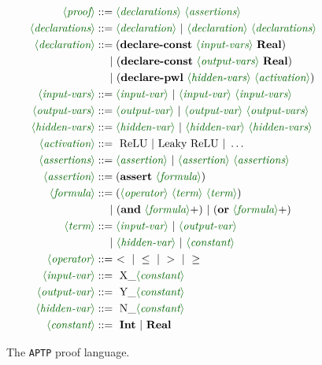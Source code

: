 \documentclass[oneside,11pt,dvipsnames]{book}
\newcommand{\nnproofformat}{\texttt{APTP}}
\begin{document}
\begin{figure}
{\small
\begin{align*}
    \lra{proof}         &::= \lra{declarations} \ \lra{assertions} \\
    \lra{declarations}  &::= \lra{declaration} \ | \ \lra{declaration} \ \lra{declarations} \\
    \lra{declaration}   &::= (\textbf{declare-const} \ \lra{input-vars} \ \textbf{Real}) \\
                        & \quad ~| \ (\textbf{declare-const} \ \lra{output-vars} \ \textbf{Real}) \\
                        & \quad ~| \ (\textbf{declare-pwl} \ \lra{hidden-vars} \ \lra{activation}) \\
    \lra{input-vars}    &::= \lra{input-var} \ | \ \lra{input-var} \ \lra{input-vars} \\
    \lra{output-vars}    &::= \lra{output-var} \ | \ \lra{output-var} \ \lra{output-vars} \\
    \lra{hidden-vars}    &::= \lra{hidden-var} \ | \ \lra{hidden-var} \ \lra{hidden-vars} \\
    \lra{activation}    &::= ~\text{ReLU} \ | \ \text{Leaky ReLU} \ | \ \ldots \\
    \lra{assertions}    &::= \lra{assertion} \ | \ \lra{assertion} \ \lra{assertions} \\
    \lra{assertion}     &::= (\textbf{assert} \ \lra{formula}) \\
    \lra{formula}       &::= (\lra{operator} \ \lra{term} \ \lra{term}) \\
                        & \quad ~| \ (\textbf{and} \ \lra{formula}+) \ | \ (\textbf{or} \ \lra{formula}+) \\
    \lra{term}          &::= \lra{input-var} \ | \ \lra{output-var} \\ 
                        & \quad ~| \ \lra{hidden-var} \ | \ \lra{constant} \\
    \lra{operator}      &::= ~ < \ | \ \leq \ | \ > \ | \ \geq \\
    \lra{input-var}     &::= ~\text{X\_}\lra{constant} \\
    \lra{output-var}    &::= ~\text{Y\_}\lra{constant} \\
    \lra{hidden-var}    &::= ~\text{N\_}\lra{constant} \\
    \lra{constant}      &::= ~\textbf{Int} \ | \ \textbf{Real}
\end{align*}
}
\caption{The \nnproofformat{} proof language.}\label{fig:grammar}
\end{figure}
\end{document}
